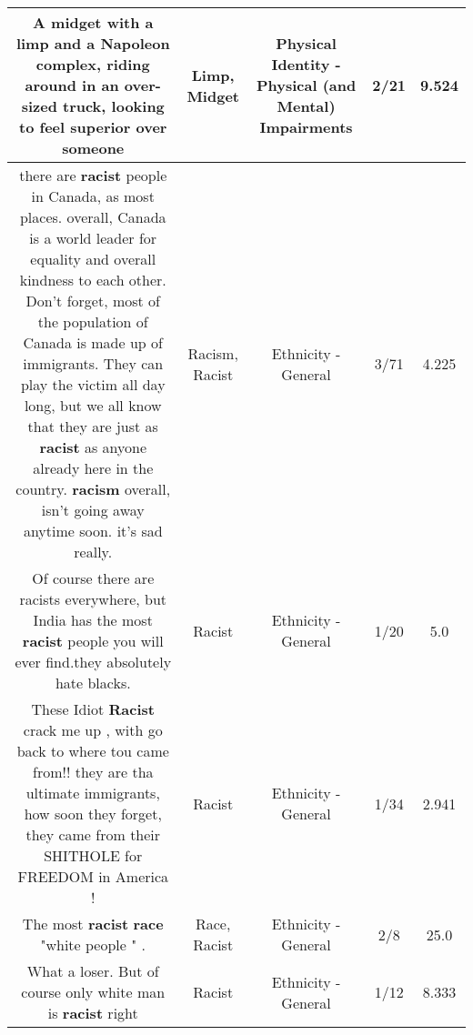 \documentclass[11pt]{article}
\newlength\mylength
\begin{document}
\begin{center}
\begin{longtable}{|C{.65\mylength}|C{.30\mylength}|C{.12\mylength}|C{.12\mylength}|C{.12\mylength}|}
  \small A \textbf{midget} with a \textbf{limp} and a Napoleon complex, riding around in an over-sized truck, looking to feel superior over someone\normalsize   & Limp, Midget & Physical Identity - Physical (and Mental) Impairments & 2/21 & 9.524 \\  \hline
  \small there are \textbf{racist} people in Canada, as most places. overall, Canada is a world leader for equality and overall kindness to each other. Don't forget, most of the population of Canada is made up of immigrants. They can play the victim all day long, but we all know that they are just as \textbf{racist} as anyone already here in the country. \textbf{racism} overall, isn't going away anytime soon. it's sad really.\normalsize   & Racism, Racist & Ethnicity - General & 3/71 & 4.225 \\  \hline
  \small Of course there are racists everywhere, but India has the most \textbf{racist} people you will ever find.they absolutely hate blacks.\normalsize   & Racist & Ethnicity - General & 1/20 & 5.0 \\  \hline
  \small These Idiot \textbf{Racist} crack me up , with go back to where tou came from!! they are tha ultimate immigrants, how soon they forget, they came from their SHITHOLE for FREEDOM in America !\normalsize   & Racist & Ethnicity - General & 1/34 & 2.941 \\  \hline
  \small The most \textbf{racist}  \textbf{race} "white people " .\normalsize   & Race, Racist & Ethnicity - General & 2/8 & 25.0 \\  \hline
  \small What a loser. But of course only white man is \textbf{racist} right\normalsize   & Racist & Ethnicity - General & 1/12 & 8.333 \\  \hline

\end{longtable}
\end{center}
\end{document}
